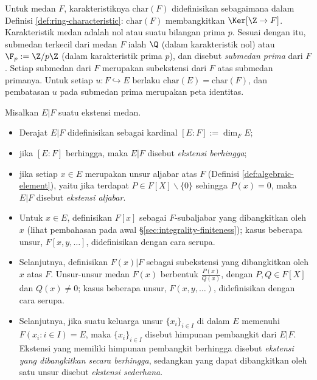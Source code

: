 Untuk medan $F$, karakteristiknya $\text{char}(F)$ didefinisikan sebagaimana dalam Definisi \ref{def:ring-characteristic}: $\text{char}(F)$ membangkitkan $\Ker[\Z \to F]$. Karakteristik medan adalah nol atau suatu bilangan prima $p$. Sesuai dengan itu, submedan terkecil dari medan $F$ ialah $\Q$ (dalam karakteristik nol) atau $\F_p := \Z/p\Z$ (dalam karakteristik prima $p$), dan disebut \emph{submedan prima} dari $F$. Setiap submedan dari $F$ merupakan subekstensi dari $F$ atas submedan primanya. Untuk setiap $u: F \hookrightarrow E$ berlaku $\text{char}(E)=\text{char}(F)$, dan pembatasan $u$ pada submedan prima merupakan peta identitas. 

\begin{definition}
	Misalkan $E|F$ suatu ekstensi medan.
	\begin{itemize}
		\item Derajat $E|F$ didefinisikan sebagai kardinal $[E:F] := \dim_F E$;\index[sym1]{$[E:F]$}
		\item jika $[E:F]$ berhingga, maka $E|F$ disebut \emph{ekstensi berhingga};
		\item jika setiap $x \in E$ merupakan unsur aljabar atas $F$ (Definisi \ref{def:algebraic-element}), yaitu jika terdapat $P \in F[X] \smallsetminus \{0\}$ sehingga $P(x)=0$, maka $E|F$ disebut \emph{ekstensi aljabar}.
		\item Untuk $x \in E$, definisikan $F[x]$ sebagai $F$-subaljabar yang dibangkitkan oleh $x$ (lihat pembahasan pada awal \S\ref{sec:integrality-finiteness}); kasus beberapa unsur, $F[x,y, \ldots]$, didefinisikan dengan cara serupa.
		\item Selanjutnya, definisikan $F(x)|F$ sebagai subekstensi yang dibangkitkan oleh $x$ atas $F$. Unsur-unsur medan $F(x)$ berbentuk $\frac{P(x)}{Q(x)}$, dengan $P,Q \in F[X]$ dan $Q(x) \neq 0$; kasus beberapa unsur, $F(x,y,\ldots)$, didefinisikan dengan cara serupa.
		\item Selanjutnya, jika suatu keluarga unsur $\{x_i\}_{i \in I}$ di dalam $E$ memenuhi $F(x_i : i \in I) = E$, maka $\{x_i\}_{i \in I}$ disebut himpunan pembangkit dari $E|F$. Ekstensi yang memiliki himpunan pembangkit berhingga disebut \emph{ekstensi yang dibangkitkan secara berhingga}, sedangkan yang dapat dibangkitkan oleh satu unsur disebut \emph{ekstensi sederhana}.
	\end{itemize}
\end{definition}

